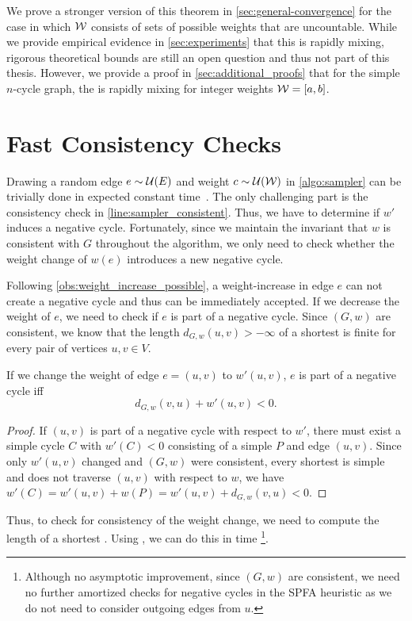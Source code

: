 We prove a stronger version of this theorem in \cref{sec:general-convergence} for the case in which $\mathcal W$ consists of sets of possible weights that are uncountable.
While we provide empirical evidence in \cref{sec:experiments} that this \markov is rapidly mixing, rigorous theoretical bounds are still an open question and thus not part of this thesis.
However, we provide a proof in \cref{sec:additional_proofs} that for the simple $n$-cycle graph, the \markov is rapidly mixing for integer weights $\mathcal W = [a,b]$.


\section{Fast Consistency Checks}
Drawing a random edge $e \sim \mathcal U(E)$ and weight $c \sim \mathcal U(\mathcal W)$ in \cref{algo:sampler} can be trivially done in expected constant time~\cite{DBLP:journals/corr/lemire}.
The only challenging part is the consistency check in \cref{line:sampler_consistent}.
Thus, we have to determine if $w'$ induces a negative cycle.
Fortunately, since we maintain the invariant that $w$ is consistent with $G$ throughout the algorithm, we only need to check whether the weight change of $w(e)$ introduces a new negative cycle.

Following \cref{obs:weight_increase_possible}, a weight-increase in edge $e$ can not create a negative cycle and thus can be immediately accepted.
If we decrease the weight of $e$, we need to check if $e$ is part of a negative cycle.
Since $(G, w)$ are consistent, we know that the length $d_{G, w}(u, v) > -\infty$ of a shortest  is finite for every pair of vertices $u, v \in V$.

\begin{lemma}\label{lem:new_weight_in_cycle}
  If we change the weight of edge $e = (u, v)$ to $w'(u, v)$, $e$ is part of a negative cycle iff \[
    d_{G, w}(v, u) + w'(u, v) < 0.
  \] 
\end{lemma}
\begin{proof}
  If $(u, v)$ is part of a negative cycle with respect to $w'$, there must exist a simple cycle $C$ with $w'(C) < 0$ consisting of a simple  $P$ and edge $(u, v)$.
  Since only $w'(u, v)$ changed and $(G,w)$ were consistent, \ie every shortest  is simple and does not traverse $(u,v)$ with respect to $w$, we have $w'(C) = w'(u, v) + w(P) = w'(u, v) + d_{G, w}(v, u) < 0$.
\end{proof}

\noindent Thus, to check for consistency of the weight change, we need to compute the length of a shortest .
Using \algbf, we can do this in time \footnote{
  Although no asymptotic improvement, since $(G, w)$ are consistent, we need no further amortized checks for negative cycles in the SPFA heuristic as we do not need to consider outgoing edges from $u$.
}.

